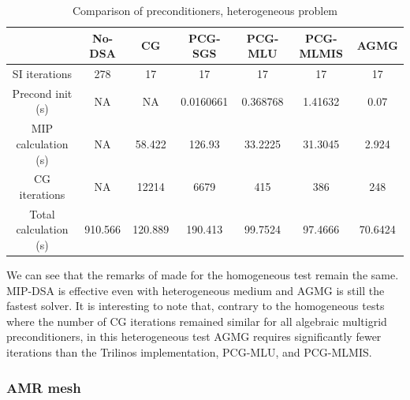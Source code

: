 \begin{table}[H]
  \begin{center}
    \caption{Comparison of preconditioners, heterogeneous problem}
    \begin{tabular}{|c|c|c|c|c|c|c|}
      \hline
      & No-DSA & CG & PCG-SGS & PCG-MLU & PCG-MLMIS & AGMG\\
      \hline
      SI iterations & 278     & 17      & 17        & 17       & 17      & 17  \\
   Precond init (s) & NA      & NA      & 0.0160661 & 0.368768 & 1.41632 &
      0.07  \\
MIP calculation (s) & NA      & 58.422  & 126.93    & 33.2225  & 31.3045 &
      2.924 \\
      CG iterations & NA      & 12214   & 6679      & 415      & 386     & 248  \\
Total calculation (s) & 910.566 & 120.889 & 190.413 & 99.7524  & 97.4666 &
      70.6424 \\      
      \hline
    \end{tabular}
    \label{comparison_hex}
  \end{center}
\end{table}
We can see that the remarks of  made for the homogeneous test
remain the same. MIP-DSA is effective even with heterogeneous medium and AGMG is
still the fastest solver. It is interesting to note that, contrary to the
homogeneous tests where the number of CG iterations remained similar for all
algebraic multigrid preconditioners, in this heterogeneous test AGMG requires
significantly fewer iterations than the Trilinos implementation, PCG-MLU, 
and PCG-MLMIS.

\subsubsection{AMR mesh}

